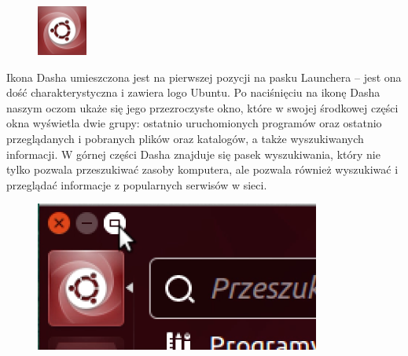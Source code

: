 \begin{figure}
	\vspace{-10pt}
	\includegraphics[width=\linewidth]{images/ikony_dash.png}
\end{figure}

Ikona Dasha umieszczona jest na pierwszej pozycji na pasku Launchera – jest ona dość charakterystyczna i zawiera logo Ubuntu. Po naciśnięciu na ikonę Dasha naszym oczom ukaże się jego przezroczyste okno, które w swojej środkowej części okna wyświetla dwie grupy: ostatnio uruchomionych programów oraz ostatnio przeglądanych i pobranych plików oraz katalogów, a także wyszukiwanych informacji. W górnej części Dasha znajduje się pasek wyszukiwania, który nie tylko pozwala przeszukiwać zasoby komputera, ale pozwala również wyszukiwać i przeglądać informacje z popularnych serwisów w sieci. 

\begin{figure}
                \includegraphics[width=\linewidth]{images/unity_dash_max.png}
\end{figure}

